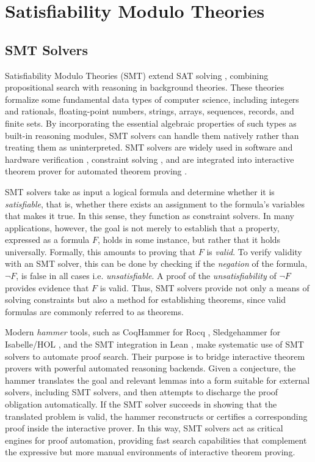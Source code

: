 \chapter{Satisfiability Modulo Theories}\label{ch:smt}


\section{SMT Solvers}

Satisfiability Modulo Theories (SMT) \cite{Barrett2021SatisfiabilityMT} extend SAT solving \cite{chaff,minitsat}, combining propositional search with reasoning in background theories.
These theories formalize some fundamental data types of computer science, including integers and rationals, floating-point numbers, strings, arrays, sequences, records, and finite sets.
By incorporating the essential algebraic properties of such types as built-in reasoning modules, SMT solvers can handle them natively rather than treating them as uninterpreted.
SMT solvers are widely used in software and hardware verification \cite{application-smt-hardware}, constraint solving \cite{awssmt,application-smt2}, and are integrated into interactive theorem prover for automated theorem proving \cite{coqhammer1,Sledgehammer, fstar,dafny, vyper}.

SMT solvers take as input a logical formula and determine whether it is \emph{satisfiable}, that is, whether there exists an assignment to the formula's variables that makes it true.
In this sense, they function as constraint solvers.
In many applications, however, the goal is not merely to establish that a property, expressed as a formula $F$, holds in some instance, but rather that it holds universally.
Formally, this amounts to proving that $F$ is \emph{valid}. To verify validity with an SMT solver, this can be done by checking
if the \emph{negation} of the formula, $\neg F$,  is false in all cases i.e. \emph{unsatisfiable}. A proof of the \emph{unsatisfiability} of $\neg F$ provides evidence that $F$ is valid.
Thus, SMT solvers provide not only a means of solving constraints but also a method for establishing theorems, since valid formulas are commonly referred to as theorems.

Modern \emph{hammer} tools, such as CoqHammer \cite{coqhammer1} for Rocq \cite{Rocq-refman}, Sledgehammer \cite{Sledgehammer} for Isabelle/HOL \cite{isabelle-hol-ref}, and the SMT integration in Lean \cite{lean-smt}, make systematic use of SMT solvers to automate proof search.
Their purpose is to bridge interactive theorem provers with powerful automated reasoning backends.
Given a conjecture, the hammer translates the goal and relevant lemmas into a form suitable for external solvers, including SMT solvers, and then attempts to discharge the proof obligation automatically.
If the SMT solver succeeds in showing that the translated problem is valid, the hammer reconstructs or certifies a corresponding proof inside the interactive prover.
In this way, SMT solvers act as critical engines for proof automation, providing fast search capabilities that complement the expressive but more manual environments of interactive theorem proving.

